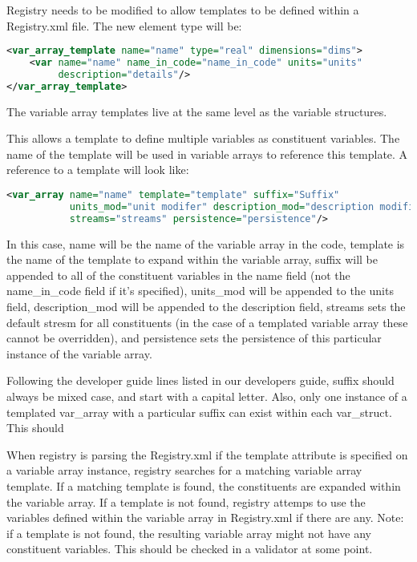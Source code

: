 \documentclass[11pt]{report}
\begin{document}
Registry needs to be modified to allow templates to be defined within a
Registry.xml file. The new element type will be:
{\scriptsize
\begin{lstlisting}[language=XML]
<var_array_template name="name" type="real" dimensions="dims">
	<var name="name" name_in_code="name_in_code" units="units"
		 description="details"/>
</var_array_template>
\end{lstlisting}
}

The variable array templates live at the same level as the variable structures.

This allows a template to define multiple variables as constituent variables.
The name of the template will be used in variable arrays to reference this
template. A reference to a template will look like:

{\scriptsize
\begin{lstlisting}[language=XML]
<var_array name="name" template="template" suffix="Suffix"
		   units_mod="unit modifer" description_mod="description modifier"
		   streams="streams" persistence="persistence"/>
\end{lstlisting}
}

In this case, name will be the name of the variable array in the code, template
is the name of the template to expand within the variable array, suffix will be
appended to all of the constituent variables in the name field (not the
name\_in\_code field if it's specified), units\_mod will be appended to the
units field, description\_mod will be appended to the description field,
streams sets the default stresm for all constituents (in the case of a
templated variable array these cannot be overridden), and persistence sets the
persistence of this particular instance of the variable array.

Following the developer guide lines listed in our developers guide, suffix
should always be mixed case, and start with a capital letter. Also, only one
instance of a templated var\_array with a particular suffix can exist within
each var\_struct. This should 

When registry is parsing the Registry.xml if the template attribute is
specified on a variable array instance, registry searches for a matching
variable array template. If a matching template is found, the constituents are
expanded within the variable array. If a template is not found, registry
attemps to use the variables defined within the variable array in Registry.xml
if there are any. Note: if a template is not found, the resulting variable
array might not have any constituent variables. This should be checked in a
validator at some point.
\end{document}
